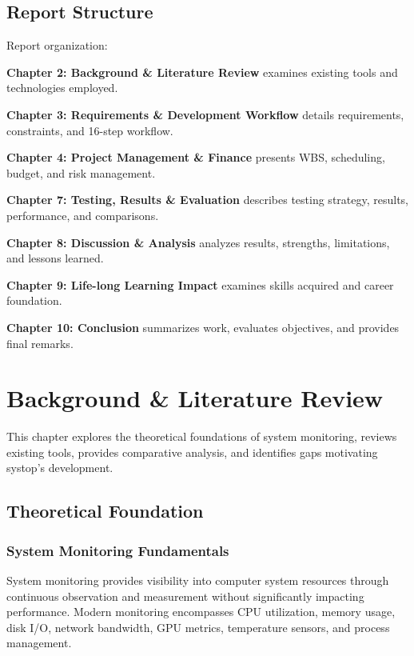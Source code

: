 \documentclass[12pt,a4paper,oneside]{report}
\begin{document}
\section{Report Structure}
\label{sec:report-structure}

Report organization:

\textbf{Chapter 2: Background \& Literature Review} examines existing tools and technologies employed.

\textbf{Chapter 3: Requirements \& Development Workflow} details requirements, constraints, and 16-step workflow.

\textbf{Chapter 4: Project Management \& Finance} presents WBS, scheduling, budget, and risk management.

\textbf{Chapter 7: Testing, Results \& Evaluation} describes testing strategy, results, performance, and comparisons.

\textbf{Chapter 8: Discussion \& Analysis} analyzes results, strengths, limitations, and lessons learned.

\textbf{Chapter 9: Life-long Learning Impact} examines skills acquired and career foundation.

\textbf{Chapter 10: Conclusion} summarizes work, evaluates objectives, and provides final remarks.

\chapter{Background \& Literature Review}
\label{chap:background}

This chapter explores the theoretical foundations of system monitoring, reviews existing tools, provides comparative analysis, and identifies gaps motivating systop's development.

\section{Theoretical Foundation}
\label{sec:theoretical-foundation}

\subsection{System Monitoring Fundamentals}

System monitoring provides visibility into computer system resources through continuous observation and measurement without significantly impacting performance. Modern monitoring encompasses CPU utilization, memory usage, disk I/O, network bandwidth, GPU metrics, temperature sensors, and process management.
\end{document}
